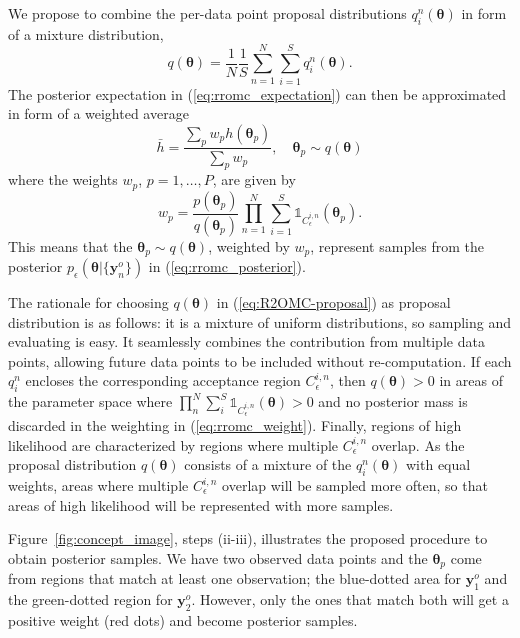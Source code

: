 \documentclass[twoside]{article}
\newcommand{\thb}{\boldsymbol{\theta}}
\newcommand{\data}{\mathbf{y}^o}
\begin{document}
We propose to combine the per-data point proposal distributions $q_i^n(\thb)$ in form of a mixture distribution,
\begin{equation}
    q(\thb) = \frac{1}{N} \frac{1}{S} \sum_{n=1}^N \sum_{i=1}^S q_i^n (\thb).
    \label{eq:R2OMC-proposal}
\end{equation}
The posterior expectation in (\ref{eq:rromc_expectation}) can then be approximated in form of a weighted average 
\begin{equation}
  \label{eq:rromc_sample_expectation}
  \bar{h} = \frac{\sum_p w_p h(\thb_p)}{\sum_p w_p}, \quad \thb_p \sim q(\thb)
\end{equation}
where the weights $w_p$, $p=1, \ldots, P$, are given by
\begin{equation}
  \label{eq:rromc_weight}
w_p= \frac{p(\thb_p)}{q(\thb_p)} \prod_{n=1}^N \sum_{i=1}^S \mathbb{1}_{C_{\epsilon}^{i,n}}(\thb_p). 
\end{equation}
This means that the $\thb_p \sim q(\thb)$, weighted by $w_p$, represent samples from the posterior $p_{\epsilon}(\thb | \{\data_n\})$ in (\ref{eq:rromc_posterior}).

The rationale for choosing $q(\thb)$ in (\ref{eq:R2OMC-proposal}) as proposal distribution is as follows: it is a mixture of uniform distributions, so sampling and evaluating is easy. It seamlessly combines the contribution from multiple data points, allowing future data points to be included without re-computation. If each $q_i^n$ encloses the corresponding acceptance region $C_{\epsilon}^{i,n}$, then $q(\thb) > 0$ in areas of the parameter space where $\prod_n^N \sum_i^S \mathbb{1}_{C_{\epsilon}^{i,n}}(\thb) > 0$ and no posterior mass is discarded in the weighting in (\ref{eq:rromc_weight}). Finally, regions of high likelihood are characterized by regions where multiple $C_{\epsilon}^{i,n}$ overlap. As the proposal distribution $q(\thb)$ consists of a mixture of the $q_i^n(\thb)$ with equal weights, areas where multiple $C_{\epsilon}^{i,n}$ overlap will be sampled more often, so that areas of high likelihood will be represented with more samples.

Figure~\ref{fig:concept_image}, steps (ii-iii), illustrates the proposed procedure to obtain posterior samples. We have two observed data points and the $\thb_p$ come from regions that match at least one observation; the blue-dotted area for $\data_1$ and the green-dotted region for $\data_2$. However, only the ones that match both will get a positive weight (red dots) and become posterior samples.
\end{document}
